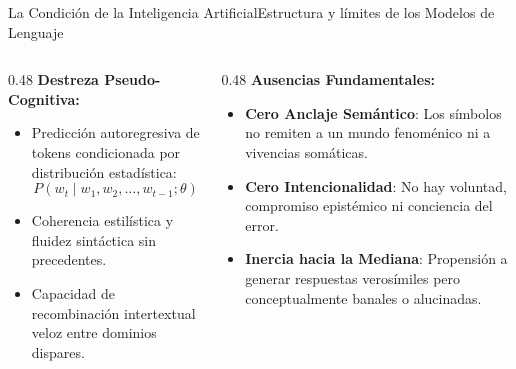 \documentclass[aspectratio=169,11pt]{beamer}
\begin{document}
\begin{frame}{La Condición de la Inteligencia Artificial}{Estructura
  y límites de los Modelos de Lenguaje}
  \begin{columns}[T]
    \begin{column}{0.48\textwidth}
      \textbf{\color{primaryDark}Destreza Pseudo-Cognitiva:}
    \begin{itemize}\setlength{\itemsep}{0.4em}
        \item Predicción autoregresiva de tokens condicionada por
          distribución estadística:
          \[
            P(w_t \mid w_1, w_2, \dots, w_{t-1}; \theta)
          \]
        \item Coherencia estilística y fluidez sintáctica sin precedentes.
        \item Capacidad de recombinación intertextual veloz entre
          dominios dispares.
      \end{itemize}
    \end{column}
    \begin{column}{0.48\textwidth}
      \textbf{\color{accentGold}Ausencias Fundamentales:}
    \begin{itemize}\setlength{\itemsep}{0.4em}
        \item \textbf{Cero Anclaje Semántico}: Los símbolos no
          remiten a un mundo fenoménico ni a vivencias somáticas.
        \item \textbf{Cero Intencionalidad}: No hay voluntad,
          compromiso epistémico ni conciencia del error.
        \item \textbf{Inercia hacia la Mediana}: Propensión a
          generar respuestas verosímiles pero conceptualmente
          banales o alucinadas.
      \end{itemize}
    \end{column}
  \end{columns}
\end{frame}
\end{document}
